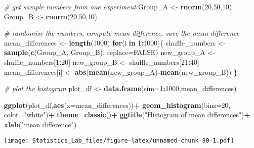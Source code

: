 \documentclass[
]{book}
\newenvironment{Shaded}{\begin{snugshade}}{\end{snugshade}}
\newcommand{\AttributeTok}[1]{\textcolor[rgb]{0.13,0.29,0.53}{#1}}
\newcommand{\CommentTok}[1]{\textcolor[rgb]{0.56,0.35,0.01}{\textit{#1}}}
\newcommand{\ConstantTok}[1]{\textcolor[rgb]{0.56,0.35,0.01}{#1}}
\newcommand{\ControlFlowTok}[1]{\textcolor[rgb]{0.13,0.29,0.53}{\textbf{#1}}}
\newcommand{\DecValTok}[1]{\textcolor[rgb]{0.00,0.00,0.81}{#1}}
\newcommand{\FunctionTok}[1]{\textcolor[rgb]{0.13,0.29,0.53}{\textbf{#1}}}
\newcommand{\NormalTok}[1]{#1}
\newcommand{\OtherTok}[1]{\textcolor[rgb]{0.56,0.35,0.01}{#1}}
\newcommand{\SpecialCharTok}[1]{\textcolor[rgb]{0.81,0.36,0.00}{\textbf{#1}}}
\newcommand{\StringTok}[1]{\textcolor[rgb]{0.31,0.60,0.02}{#1}}
\begin{document}
\begin{Shaded}
\begin{Highlighting}[]
\CommentTok{\# get sample numbers from one experiment}
\NormalTok{Group\_A }\OtherTok{\textless{}{-}} \FunctionTok{rnorm}\NormalTok{(}\DecValTok{20}\NormalTok{,}\DecValTok{50}\NormalTok{,}\DecValTok{10}\NormalTok{)}
\NormalTok{Group\_B }\OtherTok{\textless{}{-}} \FunctionTok{rnorm}\NormalTok{(}\DecValTok{20}\NormalTok{,}\DecValTok{50}\NormalTok{,}\DecValTok{10}\NormalTok{)}

\CommentTok{\# randomize the numbers, compute mean difference, save the mean difference}
\NormalTok{mean\_differences }\OtherTok{\textless{}{-}} \FunctionTok{length}\NormalTok{(}\DecValTok{1000}\NormalTok{)}
\ControlFlowTok{for}\NormalTok{(i }\ControlFlowTok{in} \DecValTok{1}\SpecialCharTok{:}\DecValTok{1000}\NormalTok{)\{}
\NormalTok{  shuffle\_numbers }\OtherTok{\textless{}{-}} \FunctionTok{sample}\NormalTok{(}\FunctionTok{c}\NormalTok{(Group\_A, Group\_B), }\AttributeTok{replace=}\ConstantTok{FALSE}\NormalTok{)}
\NormalTok{  new\_group\_A }\OtherTok{\textless{}{-}}\NormalTok{ shuffle\_numbers[}\DecValTok{1}\SpecialCharTok{:}\DecValTok{20}\NormalTok{]}
\NormalTok{  new\_group\_B }\OtherTok{\textless{}{-}}\NormalTok{ shuffle\_numbers[}\DecValTok{21}\SpecialCharTok{:}\DecValTok{40}\NormalTok{]}
\NormalTok{  mean\_differences[i] }\OtherTok{\textless{}{-}} \FunctionTok{abs}\NormalTok{(}\FunctionTok{mean}\NormalTok{(new\_group\_A)}\SpecialCharTok{{-}}\FunctionTok{mean}\NormalTok{(new\_group\_B))}
\NormalTok{\}}

\CommentTok{\# plot the histogram}
\NormalTok{plot\_df }\OtherTok{\textless{}{-}} \FunctionTok{data.frame}\NormalTok{(}\AttributeTok{sim=}\DecValTok{1}\SpecialCharTok{:}\DecValTok{1000}\NormalTok{,mean\_differences)}

\FunctionTok{ggplot}\NormalTok{(plot\_df,}\FunctionTok{aes}\NormalTok{(}\AttributeTok{x=}\NormalTok{mean\_differences))}\SpecialCharTok{+}
  \FunctionTok{geom\_histogram}\NormalTok{(}\AttributeTok{bins=}\DecValTok{20}\NormalTok{, }\AttributeTok{color=}\StringTok{"white"}\NormalTok{)}\SpecialCharTok{+}
  \FunctionTok{theme\_classic}\NormalTok{()}\SpecialCharTok{+}
  \FunctionTok{ggtitle}\NormalTok{(}\StringTok{"Histogram of mean differences"}\NormalTok{)}\SpecialCharTok{+}
  \FunctionTok{xlab}\NormalTok{(}\StringTok{"mean difference"}\NormalTok{)}
\end{Highlighting}
\end{Shaded}

\texttt{[image: Statistics\_Lab\_files/figure-latex/unnamed-chunk-80-1.pdf]}
\end{document}
